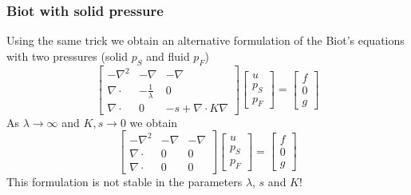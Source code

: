 \begin{frame}
\frametitle{Biot with solid pressure}
Using the same trick we obtain an alternative formulation of
the Biot's equations with two pressures (solid $p_S$ and fluid $p_F$)
\[
\left[
\begin{array}{ccc}
-\nabla^2 & -\nabla & -\nabla \\
\nabla\cdot & -\frac{1}{\lambda} & 0  \\ 
\nabla\cdot & 0 &  -s + \nabla\cdot K \nabla   
\end{array}
\right]
\left[
\begin{array}{c} u \\ p_S \\ p_F \end{array} 
\right]
= 
\left[
\begin{array}{c} f \\ 0 \\ g \end{array} 
\right]
\]
As $\lambda\rightarrow\infty$ and
$K,s \rightarrow 0$ we obtain
\[
\left[
\begin{array}{ccc}
-\nabla^2 & -\nabla & -\nabla \\
\nabla\cdot & 0 & 0  \\ 
\nabla\cdot & 0 &  0   
\end{array}
\right]
\left[
\begin{array}{c} u \\ p_S \\ p_F \end{array} 
\right]
= 
\left[
\begin{array}{c} f \\ 0 \\ g \end{array} 
\right]
\]
This formulation is not stable in the parameters $\lambda$, $s$ and $K$! 


\end{frame}
